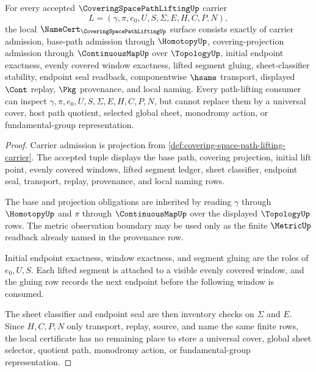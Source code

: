 \begin{theorem}
\label{thm:covering-space-path-lifting-namecert-obligations}
For every accepted $\CoveringSpacePathLiftingUp$ carrier
$$
L=(\gamma,\pi,e_0,U,S,\Sigma,E,H,C,P,N),
$$
the local $\NameCert_{\CoveringSpacePathLiftingUp}$ surface consists exactly of carrier admission, base-path admission through $\HomotopyUp$, covering-projection admission through $\ContinuousMapUp$ over $\TopologyUp$, initial endpoint exactness, evenly covered window exactness, lifted segment gluing, sheet-classifier stability, endpoint seal readback, componentwise $\hsame$ transport, displayed $\Cont$ replay, $\Pkg$ provenance, and local naming. Every path-lifting consumer can inspect $\gamma,\pi,e_0,U,S,\Sigma,E,H,C,P,N$, but cannot replace them by a universal cover, host path quotient, selected global sheet, monodromy action, or fundamental-group representation.
\end{theorem}
\begin{proof}
Carrier admission is projection from \autoref{def:covering-space-path-lifting-carrier}. The accepted tuple displays the base path, covering projection, initial lift point, evenly covered windows, lifted segment ledger, sheet classifier, endpoint seal, transport, replay, provenance, and local naming rows.

The base and projection obligations are inherited by reading $\gamma$ through $\HomotopyUp$ and $\pi$ through $\ContinuousMapUp$ over the displayed $\TopologyUp$ rows. The metric observation boundary may be used only as the finite $\MetricUp$ readback already named in the provenance row.

Initial endpoint exactness, window exactness, and segment gluing are the roles of $e_0,U,S$. Each lifted segment is attached to a visible evenly covered window, and the gluing row records the next endpoint before the following window is consumed.

The sheet classifier and endpoint seal are then inventory checks on $\Sigma$ and $E$. Since $H,C,P,N$ only transport, replay, source, and name the same finite rows, the local certificate has no remaining place to store a universal cover, global sheet selector, quotient path, monodromy action, or fundamental-group representation.
\end{proof}

